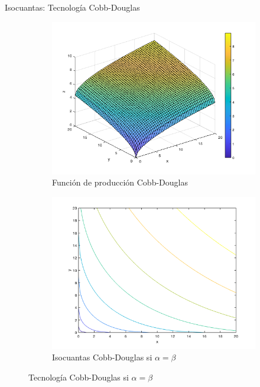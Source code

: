 \documentclass{beamer}
\theoremstyle{definition}
\begin{document}
\begin{frame}{Isocuantas: Tecnología Cobb-Douglas}
    \begin{figure}
\centering
\begin{subfigure}{.5\textwidth}
  \centering
  \includegraphics[width=1\linewidth]{figures2/cobbdouglas3d.png}
  \caption{Función de producción Cobb-Douglas}
  \label{fig:sub1}
\end{subfigure}%
\begin{subfigure}{.5\textwidth}
  \centering
  \includegraphics[width=1\linewidth]{figures2/cobbdouglaslevel.png}
  \caption{Isocuantas Cobb-Douglas si $\alpha=\beta$}
  \label{fig:sub2}
\end{subfigure}
\caption{Tecnología Cobb-Douglas si $\alpha=\beta$}
\label{fig:test}
\end{figure}
\end{frame}
\end{document}
